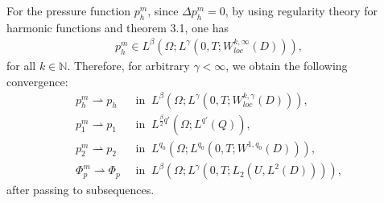 \documentclass[reqno]{amsart}
\theoremstyle{definition}
\theoremstyle{remark}
\numberwithin{equation}{section} \allowdisplaybreaks
\begin{document}
For the pressure function $p_h^m$, since $\Delta p_h^m=0$, by using
regularity theory for harmonic functions and theorem 3.1, one has
\begin{equation}\label{5.20}
\begin{split}
p_h^m\in L^{\beta}(\Omega;L^{\gamma}(0,T;W^{k,\infty}_{loc}(D))),
\end{split}
\end{equation}
for all $k\in\mathbb{N}$. Therefore, for arbitrary $\gamma<\infty$,
we obtain the following convergence:
\begin{align}\label{5.21}
p_h^m\rightharpoonup p_h&~\mbox{ in }~ L^{\beta}(\Omega;L^{\gamma}(0,T;W^{k,\gamma}_{loc}(D))),\\
\label{5.22}
p_1^m\rightharpoonup p_1&~\mbox{ in }~ L^{\frac{\beta}{2}q'}(\Omega;L^{q'}(Q)),\\
\label{5.23}
p_2^m\rightharpoonup p_2&~\mbox{ in }~ L^{q_0}(\Omega;L^{q_0}(0,T;W^{1,q_0}(D))),\\
\label{5.24} \Phi_p^m\rightharpoonup \Phi_p &~\mbox{ in }~ L^\beta
(\Omega;L^\gamma(0,T;L_2({U},L^2(D)))),
\end{align}
after passing to subsequences.
\end{document}
